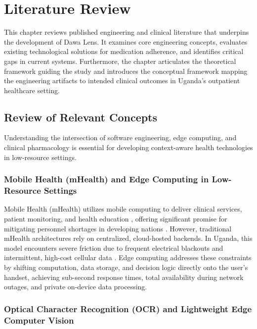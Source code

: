\chapter{Literature Review}
\label{ch:litreview}

This chapter reviews published engineering and clinical literature that underpins the development of Dawa Lens. It examines core engineering concepts, evaluates existing technological solutions for medication adherence, and identifies critical gaps in current systems. Furthermore, the chapter articulates the theoretical framework guiding the study and introduces the conceptual framework mapping the engineering artifacts to intended clinical outcomes in Uganda's outpatient healthcare setting.

\section{Review of Relevant Concepts}

Understanding the intersection of software engineering, edge computing, and clinical pharmacology is essential for developing context-aware health technologies in low-resource settings.

\subsection{Mobile Health (mHealth) and Edge Computing in Low-Resource Settings}

Mobile Health (mHealth) utilizes mobile computing to deliver clinical services, patient monitoring, and health education \cite{mechael2009case}, offering significant promise for mitigating personnel shortages in developing nations \cite{kintu2021development}. However, traditional mHealth architectures rely on centralized, cloud-hosted backends. In Uganda, this model encounters severe friction due to frequent electrical blackouts and intermittent, high-cost cellular data \cite{kintu2021development}. Edge computing addresses these constraints by shifting computation, data storage, and decision logic directly onto the user's handset, achieving sub-second response times, total availability during network outages, and private on-device data processing.

\subsection{Optical Character Recognition (OCR) and Lightweight Edge Computer Vision}

